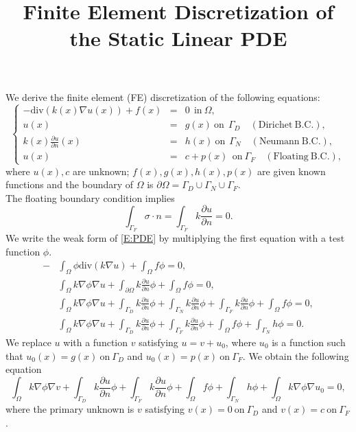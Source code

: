 \documentclass[10pt,a4paper]{article}
\author{}
\title{Finite Element Discretization of \\ the Static Linear PDE}
\begin{document}
\maketitle

We derive the finite element (FE) discretization of the following equations:
%
\begin{equation}\label{E:PDE}
\left\{
\begin{array}{rcl}
-\mathrm{div}(k(x)\nabla u(x)) + f(x) &=& 0 \ \ \mathrm{in}\ \Omega, \\
u(x) &=& g(x) \ \mathrm{on} \ \ \Gamma_D \quad (\mathrm{Dirichet \ B.C.}), \\
k(x) \frac{\partial u}{\partial n}(x) &=& h(x) 
\ \mathrm{on} \ \ \Gamma_N \quad (\mathrm{Neumann \ B.C.}), \\
u(x) &=& c+p(x) \ \ \mathrm{on} \ \Gamma_F \quad (\mathrm{Floating \ B.C.}),
\end{array}
\right.
\end{equation}
%
where $u(x), c$ are unknown; 
$f(x), g(x), h(x), p(x)$ are given known
functions and the boundary of $\Omega$ is 
$\partial\Omega = \Gamma_D \cup \Gamma_N \cup \Gamma_F$.\\
The floating boundary condition implies 
%
\begin{equation}\label{E:balance-eqn}
\int_{\Gamma_F} \sigma\cdot n 
= \int_{\Gamma_F} k\frac{\partial u}{\partial n} = 0.
\end{equation}
%
We write the weak form of \eqref{E:PDE} by multiplying 
the first equation with a test function $\phi$.
%
\begin{align*}
-&\int_\Omega \phi \mathrm{div}(k\nabla u) + \int_\Omega f\phi = 0, \\
&\int_\Omega k\nabla\phi \nabla u + \int_{\partial\Omega} k\frac{\partial u}{\partial n} \phi +\int_\Omega f\phi = 0, \\
&\int_\Omega k\nabla\phi \nabla u + \int_{\Gamma_D} k\frac{\partial u}{\partial n} \phi + \int_{\Gamma_N} k\frac{\partial u}{\partial n} \phi + \int_{\Gamma_F} k\frac{\partial u}{\partial n} \phi +\int_\Omega f\phi = 0, \\
&\int_\Omega k\nabla\phi \nabla u + \int_{\Gamma_D} k\frac{\partial u}{\partial n} \phi  + \int_{\Gamma_F} k\frac{\partial u}{\partial n} \phi +\int_\Omega f\phi 
+ \int_{\Gamma_N} h \phi = 0.
\end{align*}
%
We replace $u$ with a function $v$ satisfying $u = v + u_0$, 
where $u_0$ is a function such that $u_0(x) = g(x) \ \mathrm{on} \ \Gamma_D$
and $u_0(x) = p(x) \ \mathrm{on} \ \Gamma_F$. 
We obtain the following equation
%
\begin{equation*}
\int_\Omega k\nabla\phi \nabla v + \int_{\Gamma_D} k\frac{\partial u}{\partial n} \phi + \int_{\Gamma_F} k\frac{\partial u}{\partial n} \phi + \int_\Omega f\phi + \int_{\Gamma_N} h\phi + \int_\Omega k\nabla\phi \nabla u_0= 0,
\end{equation*}
%
where the primary unknown is $v$ satisfying 
$v(x) = 0 \ \mathrm{on} \ \Gamma_D$ and 
$v(x) = c \ \mathrm{on} \ \Gamma_F$.
\end{document}
